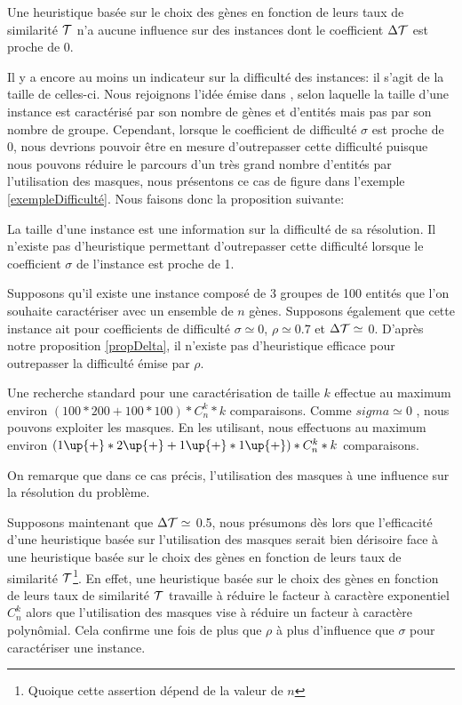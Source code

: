 \begin{proposition}
Une heuristique basée sur le choix des gènes en fonction de leurs taux de similarité $\cal{T}$ n'a aucune influence sur des instances dont le coefficient $\Delta\cal{T}$ est proche de 0.
\label{propDelta}
\end{proposition}

Il y a encore au moins un indicateur sur la difficulté des instances: il s'agit de la taille de celles-ci. Nous rejoignons l'idée émise dans \cite{Chhel2013}, selon laquelle la taille d'une instance est caractérisé par son nombre de gènes et d'entités mais pas par son nombre de groupe. Cependant, lorsque le coefficient de difficulté $\sigma$ est proche de 0, nous devrions pouvoir être en mesure d'outrepasser cette difficulté puisque nous pouvons réduire le parcours d'un très grand nombre d'entités par l'utilisation des masques, nous présentons ce cas de figure dans l'exemple \ref{exempleDifficulté}. Nous faisons donc la proposition suivante:



\begin{proposition}
La taille d'une instance est une information sur la difficulté de sa résolution. Il n'existe pas d'heuristique permettant d'outrepasser cette difficulté lorsque le coefficient $\sigma$ de l'instance est proche de 1.
\end{proposition}

\begin{exemple}
Supposons qu'il existe une instance composé de 3 groupes de 100 entités que l'on souhaite caractériser avec un ensemble de $n$ gènes. Supposons également que cette instance ait pour coefficients de difficulté $\sigma \simeq 0$, $\rho \simeq 0.7$ et $\Delta\cal{T} \simeq$ 0. D'après notre proposition \ref{propDelta}, il n'existe pas d'heuristique efficace pour outrepasser la difficulté émise par $\rho$.

Une recherche standard pour une caractérisation de taille $k$ effectue au maximum environ $ (100*200 + 100*100) * C_n^k * k$ comparaisons. Comme $sigma \simeq 0$ , nous pouvons exploiter les masques. En les utilisant, nous effectuons au maximum environ $ (1\up{+} * 2\up{+} + 1\up{+}*1\up{+}) * C_n^k * k $ comparaisons.

On remarque que dans ce cas précis, l'utilisation des masques à une influence sur la résolution du problème.

Supposons maintenant que $\Delta\cal{T} \simeq $ 0.5, nous présumons dès lors que l'efficacité d'une heuristique basée sur l'utilisation des masques serait bien dérisoire face à une heuristique basée sur le choix des gènes en fonction de leurs taux de similarité $\cal{T}$\footnote{Quoique cette assertion dépend de la valeur de $n$}. En effet, une heuristique basée sur le choix des gènes en fonction de leurs taux de similarité $\cal{T}$ travaille à réduire le facteur à caractère exponentiel $C_n^k$ alors que l'utilisation des masques vise à réduire un facteur à caractère polynômial. Cela confirme une fois de plus que $\rho$ à plus d'influence que $\sigma$ pour caractériser une instance.
\label{exempleDifficulté}
\end{exemple}


